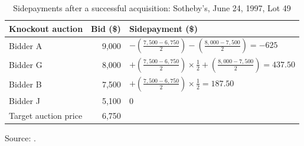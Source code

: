 \begin{table}[htbp]
\centering
\caption{Sidepayments after a successful acquisition: Sotheby's, June 24, 1997, Lot 49}
\label{tab:13-asker-ex1}
\begin{threeparttable}
\begin{tabular}{@{}lrl@{}}
\toprule
Knockout auction & Bid (\$) & Sidepayment (\$) \\
\midrule
Bidder A & 9,000 & $-\left(\frac{7{,}500-6{,}750}{2}\right)-\left(\frac{8{,}000-7{,}500}{2}\right)=-625$ \\[6pt]
Bidder G & 8,000 & $+\left(\frac{7{,}500-6{,}750}{2}\right)\times\frac{1}{2}+\left(\frac{8{,}000-7{,}500}{2}\right)=437.50$ \\[6pt]
Bidder B & 7,500 & $+\left(\frac{7{,}500-6{,}750}{2}\right)\times\frac{1}{2}=187.50$ \\[6pt]
Bidder J & 5,100 & 0 \\[2pt]
Target auction price & 6,750 & \\
\bottomrule
\end{tabular}
\begin{tablenotes}\footnotesize
\item Source: \citet[Example 1]{Asker2010}.
\end{tablenotes}
\end{threeparttable}
\end{table}

